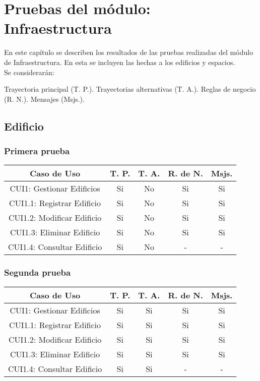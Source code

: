 \newpage

\section{Pruebas del módulo: Infraestructura} \label{chp:pruebasInfraestructura}
En este capítulo se describen los resultados de las pruebas realizadas del módulo de Infraestructura. En esta se incluyen las hechas a los edificios y espacios. \\

Se considerarán: \\
\begin{Titemize}
	\Titem Trayectoria principal (T. P.).
	\Titem Trayectorias alternativas (T. A.).
	\Titem Reglas de negocio (R. N.).
	\Titem Mensajes (Msjs.).
\end{Titemize}


\subsection{Edificio}

\subsubsection{Primera prueba}
\begin{center}
	\begin{tabular}{ |c|c|c|c|c| } 
		\hline
		Caso de Uso & T. P. & T. A. & R. de N. & Msjs. \\
		\hline 
		CUI1: Gestionar Edificios & Si & No & Si & Si \\ 
		CUI1.1: Registrar Edificio & Si & No & Si & Si \\ 
		CUI1.2: Modificar Edificio & Si & No & Si & Si \\ 
		CUI1.3: Eliminar Edificio & Si & No & Si & Si \\ 
		CUI1.4: Consultar Edificio & Si & No & - & - \\  
		\hline
	\end{tabular}
\end{center}

\subsubsection{Segunda prueba}
\begin{center}
	\begin{tabular}{ |c|c|c|c|c| } 
		\hline
		Caso de Uso & T. P. & T. A. & R. de N. & Msjs. \\
		\hline 
		CUI1: Gestionar Edificios & Si & Si & Si & Si \\ 
		CUI1.1: Registrar Edificio & Si & Si & Si & Si \\ 
		CUI1.2: Modificar Edificio & Si & Si & Si & Si \\ 
		CUI1.3: Eliminar Edificio & Si & Si & Si & Si \\ 
		CUI1.4: Consultar Edificio & Si & Si & - & - \\ 

		\hline
	\end{tabular}
\end{center}


